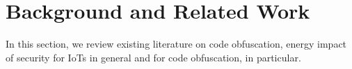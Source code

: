 \section{Background and Related Work}\label{sec:related}

In this section, we review existing literature on code obfuscation, energy impact of security for IoTs in general and for code obfuscation, in particular. 





